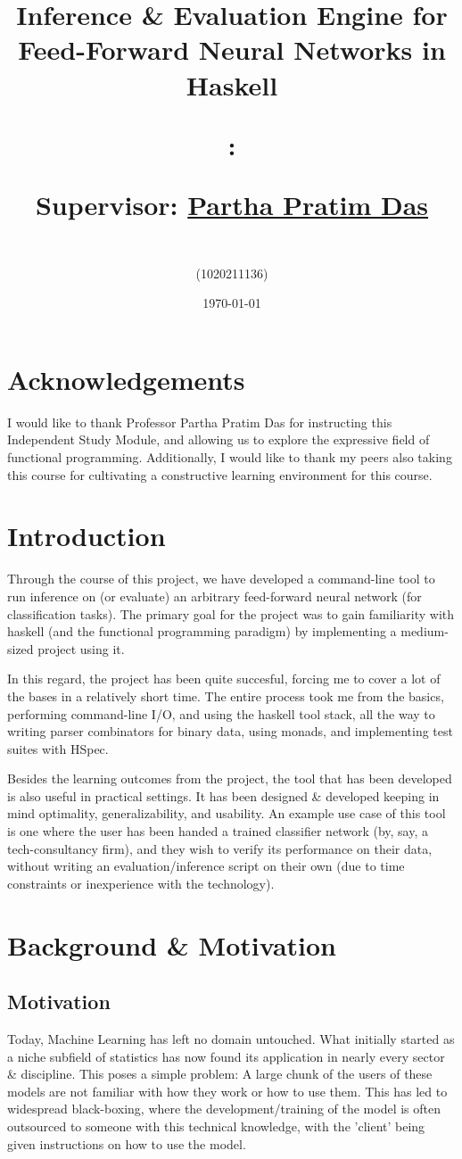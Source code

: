 \documentclass[12pt, titlepage]{article}
\title{Inference \& Evaluation Engine for Feed-Forward Neural Networks in Haskell\vspace*{2mm}

{\large \code: \name}

{\large Supervisor: \href{https://www.ashoka.edu.in/profile/partha-pratim-das/}{Partha Pratim Das}}}
\author{\textbf{\me}\\(1020211136)}
\date{\today}
\begin{document}
\maketitle

\tableofcontents
\newpage

\section{Acknowledgements}
I would like to thank Professor Partha Pratim Das for instructing this Independent Study Module, and allowing us to explore the expressive field of functional programming. Additionally, I would like to thank my peers also taking this course for cultivating a constructive learning environment for this course.
\newpage

\section{Introduction}
Through the course of this project, we have developed a command-line tool to run inference on (or evaluate) an arbitrary feed-forward neural network (for classification tasks). The primary goal for the project was to gain familiarity with haskell (and the functional programming paradigm) by implementing a medium-sized project using it.\bigskip

In this regard, the project has been quite succesful, forcing me to cover a lot of the bases in a relatively short time. The entire process took me from the basics, performing command-line I/O, and using the haskell tool stack, all the way to writing parser combinators for binary data, using monads, and implementing test suites with HSpec.\bigskip

Besides the learning outcomes from the project, the tool that has been developed is also useful in practical settings. It has been designed \& developed keeping in mind optimality, generalizability, and usability. An example use case of this tool is one where the user has been handed a trained classifier network (by, say, a tech-consultancy firm), and they wish to verify its performance on their data, without writing an evaluation/inference script on their own (due to time constraints or inexperience with the technology).

\section{Background \& Motivation}
\subsection{Motivation}\label{sec:3.1}
Today, Machine Learning has left no domain untouched. What initially started as a niche subfield of statistics has now found its application in nearly every sector \& discipline. This poses a simple problem: A large chunk of the users of these models are not familiar with how they work or how to use them. This has led to widespread black-boxing, where the development/training of the model is often outsourced to someone with this technical knowledge, with the 'client' being given instructions on how to use the model.\bigskip
\end{document}
